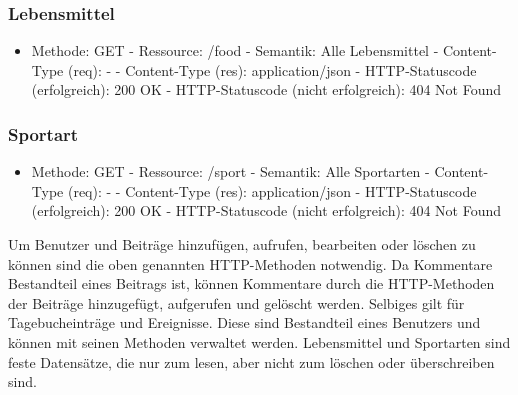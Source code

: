 		\subsubsection{Lebensmittel}
	\begin{itemize}
	\item Methode: GET\newline
	\noindent\hspace*{10mm} - Ressource: /food \newline
	\noindent\hspace*{10mm} - Semantik: Alle Lebensmittel \newline
	\noindent\hspace*{10mm} - Content-Type (req): - \newline
	\noindent\hspace*{10mm} - Content-Type (res): application/json \newline
	\noindent\hspace*{10mm} - HTTP-Statuscode (erfolgreich): 200 OK \newline
	\noindent\hspace*{10mm} - HTTP-Statuscode (nicht erfolgreich): 404 Not Found
	\end{itemize}
\subsubsection{Sportart}
\begin{itemize}
	\item Methode: GET\newline
	\noindent\hspace*{10mm} - Ressource: /sport \newline
	\noindent\hspace*{10mm} - Semantik: Alle Sportarten \newline
	\noindent\hspace*{10mm} - Content-Type (req): - \newline
	\noindent\hspace*{10mm} - Content-Type (res): application/json \newline
	\noindent\hspace*{10mm} - HTTP-Statuscode (erfolgreich): 200 OK \newline
	\noindent\hspace*{10mm} - HTTP-Statuscode (nicht erfolgreich): 404 Not Found
	\end{itemize}
	Um Benutzer und Beiträge hinzufügen, aufrufen, bearbeiten oder löschen zu können sind die oben genannten HTTP-Methoden notwendig. Da Kommentare Bestandteil eines Beitrags ist, können Kommentare durch die HTTP-Methoden der Beiträge hinzugefügt, aufgerufen und gelöscht werden. Selbiges gilt für Tagebucheinträge und Ereignisse. Diese sind Bestandteil eines Benutzers und können mit seinen Methoden verwaltet werden.
	Lebensmittel und Sportarten sind feste Datensätze, die nur zum lesen, aber nicht zum löschen oder überschreiben sind.\newline
